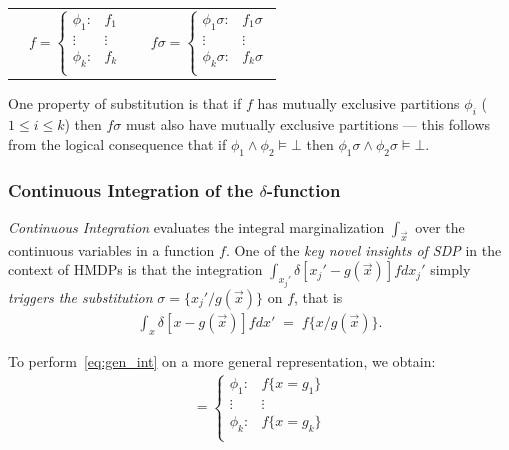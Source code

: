 \documentclass[twoside,11pt]{article}
\begin{document}
{%
\begin{center}
\begin{tabular}{r c c l}
&
\hspace{-6mm} 
  $f = \begin{cases}
    \phi_1: & f_1 \\ 
   \vdots&\vdots\\ 
    \phi_k: & f_k \\ 
  \end{cases}$
&

&
\hspace{-2mm}
  $f\sigma = \begin{cases}
    \phi_1\sigma: & f_1\sigma \\ 
   \vdots&\vdots\\ 
    \phi_k\sigma: & f_k\sigma \\ 
  \end{cases}$
\end{tabular}
\end{center}
}
\normalsize

One property of substitution is that
if $f$ has mutually exclusive partitions $\phi_i$ ($1 \leq i \leq k$)
then $f\sigma$ must also have mutually exclusive partitions ---
this follows from the logical consequence that 
if $\phi_1 \land \phi_2 \models \bot$
then $\phi_1\sigma \land \phi_2\sigma \models \bot$.

\subsubsection*{Continuous Integration of the $\delta$-function}
\emph{Continuous Integration} evaluates the integral
marginalization $\int_{\vec{x}}$ over the continuous variables
in a function $f$. One of the \emph{key novel insights of SDP} in the context of
HMDPs is that the integration 
$\int_{x_j'} \delta[x_j' - g(\vec{x})] f dx_j'$ 
simply \emph{triggers the substitution} $\sigma = \{ x_j' / g(\vec{x}) \}$
on $f$, that is
\begin{align}
\int_{x} \delta[x - g(\vec{x})] f dx' \; = \; f \{x / g(\vec{x}) \} . \label{eq:gen_int}
\end{align}

To perform~\eqref{eq:gen_int} on a more general
representation, we obtain: 
\begin{align*}
    = \begin{cases}
    \phi_1: & f \{ x = g_1 \} \\ 
   \vdots&\vdots\\ 
    \phi_k: & f \{ x= g_k \}  \\ 
  \end{cases}
\end{align*}
\end{document}
